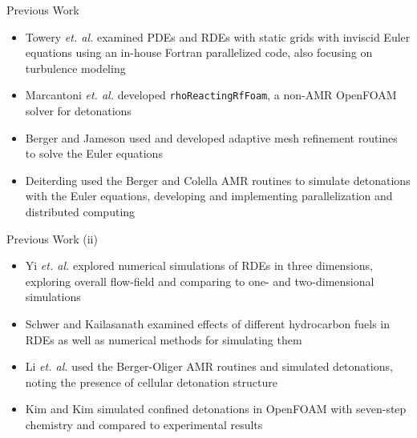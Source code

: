 \begin{frame}{Previous Work}
\begin{itemize}
\item Towery \textit{et. al.} \cite{towery1} examined PDEs and RDEs with static grids with inviscid Euler equations using an in-house Fortran parallelized code, also focusing on turbulence modeling 
\item Marcantoni \textit{et. al.} \cite{marcantoni} developed \texttt{rhoReactingRfFoam}, a non-AMR OpenFOAM solver for detonations 
\item Berger and Jameson \cite{berger1985} used and developed adaptive mesh refinement routines to solve the Euler equations 
\item Deiterding \cite{deiterding} used the Berger and Colella \cite{berger1989} AMR routines to simulate detonations with the Euler equations, developing and implementing parallelization and distributed computing 
\end{itemize}
\end{frame}

\begin{frame}{Previous Work (ii)}
\begin{itemize}
\item Yi \textit{et. al.} \cite{yi} explored numerical simulations of RDEs in three dimensions, exploring overall flow-field and comparing to one- and two-dimensional simulations 
\item Schwer and Kailasanath \cite{schwer1} examined effects of different hydrocarbon fuels in RDEs as well as numerical methods for simulating them 
\item Li \textit{et. al.} \cite{li} used the Berger-Oliger AMR routines \cite{berger1984} and simulated detonations, noting the presence of cellular detonation structure 
\item Kim and Kim \cite{kim} simulated confined detonations in OpenFOAM with seven-step chemistry and compared to experimental results 
\end{itemize}
\end{frame}

